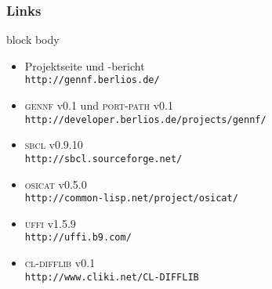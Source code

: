 \documentclass[german, presentation]{beamer}
\newcommand{\GENNF}{\textsc{gennf}}
\begin{document}
\begin{frame}
  \frametitle{Links}
  \begin{beamercolorbox}{block body}
    \begin{itemize}
    \item Projektseite und -bericht \\ \texttt{http://gennf.berlios.de/}
    \item \GENNF{} v0.1 und \textsc{port-path} v0.1 \\
      \texttt{http://developer.berlios.de/projects/gennf/}
    \item \textsc{sbcl} v0.9.10 \\
      \texttt{http://sbcl.sourceforge.net/}
    \item \textsc{osicat} v0.5.0 \\
      \texttt{http://common-lisp.net/project/osicat/}
    \item \textsc{uffi} v1.5.9 \\
      \texttt{http://uffi.b9.com/}
    \item \textsc{cl-difflib} v0.1 \\
      \texttt{http://www.cliki.net/CL-DIFFLIB}
    \end{itemize}

    
  \end{beamercolorbox}
\end{frame}
\end{document}

